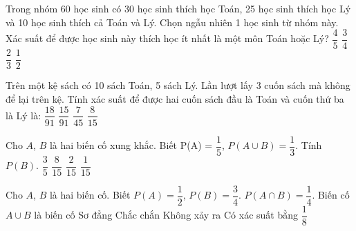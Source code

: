 \begin{ex}
Trong nhóm 60 học sinh có 30 học sinh thích học Toán, 25 học sinh thích học Lý và 10 học sinh thích cả Toán và Lý. Chọn ngẫu nhiên 1 học sinh từ nhóm này. Xác suất để được học sinh này thích học ít nhất là một môn Toán hoặc Lý?
\choice
{$\dfrac{4}{5}$}
{\True $\dfrac{3}{4}$}
{$\dfrac{2}{3}$}
{$\dfrac{1}{2}$}
\end{ex}
\begin{ex}
Trên một kệ sách có 10 sách Toán, 5 sách Lý. Lần lượt lấy 3 cuốn sách mà không để lại trên kệ. Tính xác suất để được hai cuốn sách đầu là Toán và cuốn thứ ba là Lý là:
\choice
{$\dfrac{18}{91}$}
{\True $\dfrac{15}{91}$}
{$\dfrac{7}{45}$}
{$\dfrac{8}{15}$}
\end{ex}
\begin{ex}
Cho $A$, $B$ là hai biến cố xung khắc. Biết P(A) = $\dfrac{1}{5}$, $P(A \cup B) = \dfrac{1}{3}$. Tính $P(B)$.
\choice
{$\dfrac{3}{5}$}
{$\dfrac{8}{15}$}
{\True $\dfrac{2}{15}$}
{$\dfrac{1}{15}$}
\end{ex}
\begin{ex}
Cho $A$, $B$ là hai biến cố. Biết $P(A) = \dfrac{1}{2}$, $P(B) =\dfrac{3}{4}$. $P(A \cap B) = \dfrac{1}{4}$. Biến cố $A \cup B$ là biến cố
\choice
{Sơ đẳng}
{\True Chắc chắn}
{Không xảy ra}
{Có xác suất bằng $\dfrac{1}{8}$}
\end{ex}
